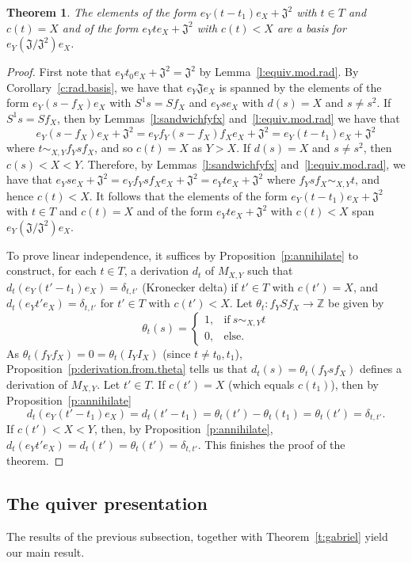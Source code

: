 \documentclass[reqno,11pt]{amsart}
\newtheorem{Thm}{Theorem}[section]
\numberwithin{equation}{section}
\begin{document}
\begin{Thm}
    The elements of the form $e_Y(t-t_1)e_X +\mathfrak J^2$ with $t\in T$ and $c(t)=X$ and of the form $e_Yte_X+\mathfrak J^2$ with $c(t)<X$ are a basis for $e_Y(\mathfrak J/\mathfrak J^2)e_X$.
\end{Thm}
\begin{proof}
First note that $e_Yt_0e_X+\mathfrak J^2=\mathfrak J^2$ by Lemma~\ref{l:equiv.mod.rad}.  By Corollary~\ref{c:rad.basis}, we have that $e_Y\mathfrak Je_X$ is spanned by the elements of the form $e_Y(s-f_X)e_X$ with $S^1s=Sf_X$ and $e_Yse_X$ with $d(s)=X$ and $s\neq s^2$.  If $S^1s=Sf_X$, then by Lemmas~\ref{l:sandwichfyfx} and~\ref{l:equiv.mod.rad} we have that  \[e_Y(s-f_X)e_X+\mathfrak J^2 = e_Yf_Y(s-f_X)f_Xe_X+\mathfrak J^2 = e_Y(t-t_1)e_X+\mathfrak J^2\] where $t\sim_{X,Y} f_Ysf_X$, and so $c(t)=X$ as $Y>X$.  If $d(s)=X$ and $s\neq s^2$, then $c(s)<X<Y$.  Therefore, by Lemmas~\ref{l:sandwichfyfx} and~\ref{l:equiv.mod.rad}, we have that $e_Yse_X+\mathfrak J^2 = e_Yf_Ysf_Xe_X+\mathfrak J^2 = e_Yte_X+\mathfrak J^2$ where $f_Ysf_X\sim_{X,Y} t$, and hence $c(t)<X$.  It follows that the elements of the form    $e_Y(t-t_1)e_X +\mathfrak J^2$ with $t\in T$ and $c(t)=X$ and of the form $e_Yte_X+\mathfrak J^2$ with $c(t)<X$ span  $e_Y(\mathfrak J/\mathfrak J^2)e_X$.


To prove linear independence, it suffices by Proposition~\ref{p:annihilate} to construct, for each $t\in T$, a derivation $d_t$ of $M_{X,Y}$ such that $d_t(e_Y(t'-t_1)e_X)=\delta_{t,t'}$ (Kronecker delta) if $t'\in T$ with $c(t')=X$, and $d_t(e_Yt'e_X) = \delta_{t,t'}$  for $t'\in T$ with $c(t')<X$.   Let $\theta_t\colon f_YSf_X\to \mathbb Z$ be given by 
    \[\theta_t(s) = \begin{cases}
        1, & \text{if}\ s\sim_{X,Y} t\\ 0, & \text{else.}
                    \end{cases}\]
As $\theta_t(f_Yf_X) = 0=\theta_t(I_YI_X)$ (since $t\neq t_0,t_1$),  Proposition~\ref{p:derivation.from.theta} tells us that $d_t(s) = \theta_t(f_Ysf_X)$ defines a derivation of $M_{X,Y}$. Let $t'\in T$.   If $c(t')=X$ (which equals $c(t_1)$), then by Proposition~\ref{p:annihilate} 
\[d_t(e_Y(t'-t_1)e_X)= d_t(t'-t_1) = \theta_t(t')-\theta_t(t_1) =\theta_t(t')= \delta_{t,t'}.\] If $c(t')<X<Y$, then, by Proposition~\ref{p:annihilate},  $d_t(e_Yt'e_X) = d_t(t')=\theta_t(t') = \delta_{t,t'}$.  This finishes the proof of the theorem.
\end{proof}

\subsection{The quiver presentation}
The results of the previous subsection, together with Theorem~\ref{t:gabriel} yield our main result.
\end{document}
